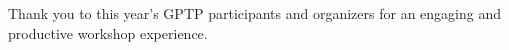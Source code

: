 
Thank you to this year's GPTP participants and organizers for an engaging and productive workshop experience.
